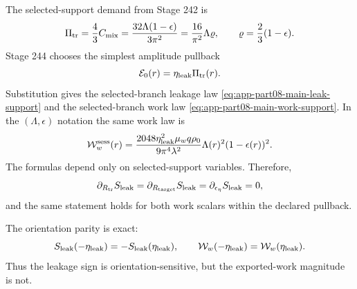 The selected-support demand from Stage 242 is
\begin{equation}
\label{eq:app-part08-stage244-pitr}
\Pi_{\rm tr}
=
\frac43C_{\rm mix}
=
\frac{32\Lambda(1-
\epsilon)}{3\pi^2}
=
\frac{16}{\pi^2}\Lambda\varrho,
\qquad
\varrho=\frac23(1-\epsilon).
\end{equation}
Stage 244 chooses the simplest amplitude pullback
\begin{equation}
\label{eq:app-part08-stage244-e0-pullback}
\mathcal E_0(r)=\eta_{\rm leak}\Pi_{\rm tr}(r).
\end{equation}
Substitution gives the selected-branch leakage law \cref{eq:app-part08-main-leak-support} and the selected-branch work law \cref{eq:app-part08-main-work-support}.  In the \((\Lambda,\epsilon)\) notation the same work law is
\begin{equation}
\label{eq:app-part08-stage244-work-epsilon}
\mathcal W_w^{\rm sess}(r)
=
\frac{2048\eta_{\rm leak}^{2}\mu_wq\rho_0}{9\pi^4\lambda^2}
\Lambda(r)^2(1-\epsilon(r))^2.
\end{equation}
The formulas depend only on selected-support variables.  Therefore,
\begin{equation}
\label{eq:app-part08-stage244-support-orbit-split}
\partial_{R_{\rm tr}}S_{\rm leak}
=
\partial_{R_{\rm target}}S_{\rm leak}
=
\partial_{\epsilon_\eta}S_{\rm leak}=0,
\end{equation}
and the same statement holds for both work scalars within the declared pullback.

The orientation parity is exact:
\begin{equation}
\label{eq:app-part08-stage244-parity}
S_{\rm leak}(-\eta_{\rm leak})=-S_{\rm leak}(\eta_{\rm leak}),
\qquad
\mathcal W_w(-\eta_{\rm leak})=\mathcal W_w(\eta_{\rm leak}).
\end{equation}
Thus the leakage sign is orientation-sensitive, but the exported-work magnitude is not.
